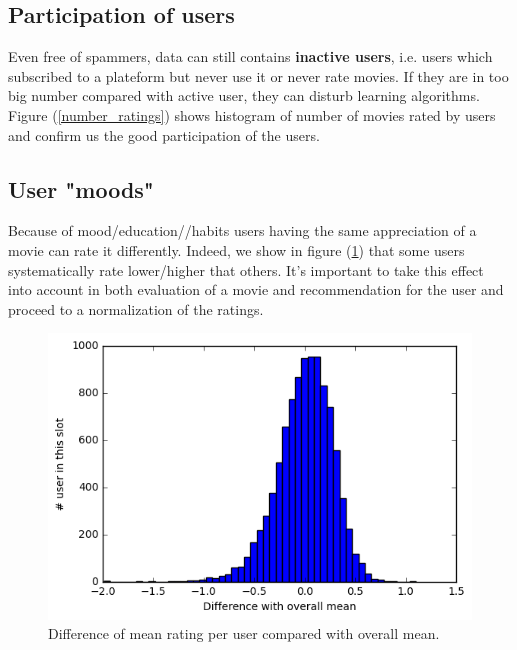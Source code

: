 \documentclass[10pt,conference,compsocconf]{IEEEtran}
\begin{document}
\subsection{Participation of users}

Even free of spammers, data can still contains \textbf{inactive users}, i.e. users which subscribed to a plateform but never use it or never rate movies. If they are in too big number compared with active user, they can disturb learning algorithms. Figure (\ref{number_ratings}) shows histogram of number of movies rated by users and confirm us the good participation of the users.

\subsection{User "moods"}

Because of mood/education//habits users having the same appreciation of a movie can rate it differently. Indeed, we show in figure (\ref{mood}) that some users systematically rate lower/higher that others. It's important to take this effect into account in both evaluation of a movie and recommendation for the user and proceed to a normalization of the ratings.



\begin{figure}[htbp] %
  \centering
  \includegraphics[width=\columnwidth]{img/Deviation_mean}
  \caption{Difference of mean rating per user compared with overall mean.}
  \vspace{-3mm}
  \label{mood}
\end{figure}

\end{document}
